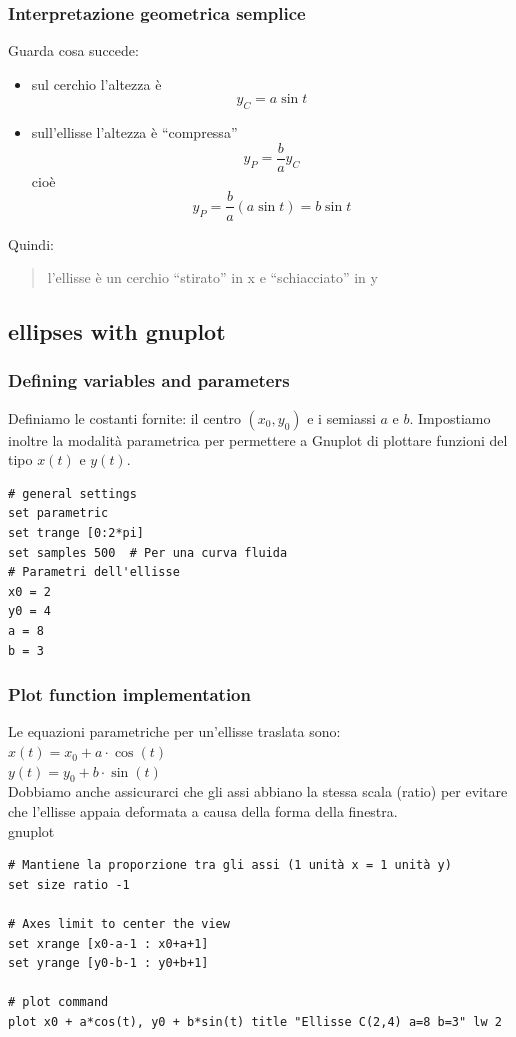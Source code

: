 \documentclass[a4paper,14pt]{article}
\begin{document}
\subsubsection{Interpretazione geometrica semplice}
Guarda cosa succede:
\begin{itemize}
\item sul cerchio l’altezza è
\[ y_C=a\sin⁡t \]
\item sull’ellisse l’altezza è “compressa”
\[y_P=\frac{b}{a}y_C\]
cioè
\[y_P=\frac{b}{a}(a\sin⁡t)=b\sin⁡t\]
\end{itemize}
Quindi:\\
\begin{quote}
l’ellisse è un cerchio “stirato” in  x e “schiacciato” in y                                                           \end{quote}
\subsection{ellipses with gnuplot}
\subsubsection{Defining variables and parameters}
Definiamo le costanti fornite: il centro \((x_{0},y_{0})\) e i semiassi \(a\) e \(b\). Impostiamo inoltre la modalità parametrica per permettere a Gnuplot di plottare funzioni del tipo \(x(t)\) e \(y(t)\).
\begin{verbatim}
# general settings
set parametric
set trange [0:2*pi]
set samples 500  # Per una curva fluida
# Parametri dell'ellisse
x0 = 2
y0 = 4
a = 8
b = 3
\end{verbatim}
\subsubsection{Plot function implementation}
Le equazioni parametriche per un'ellisse traslata sono:\\
\(x(t)=x_{0}+a\cdot \cos (t)\)\\
\(y(t)=y_{0}+b\cdot \sin (t)\)\\
Dobbiamo anche assicurarci che gli assi abbiano la stessa scala (ratio) per evitare che l'ellisse appaia deformata a causa della forma della finestra.\\
gnuplot\\
\begin{verbatim}
# Mantiene la proporzione tra gli assi (1 unità x = 1 unità y)
set size ratio -1

# Axes limit to center the view
set xrange [x0-a-1 : x0+a+1]
set yrange [y0-b-1 : y0+b+1]

# plot command
plot x0 + a*cos(t), y0 + b*sin(t) title "Ellisse C(2,4) a=8 b=3" lw 2                                                                     \end{verbatim}
\end{document}
